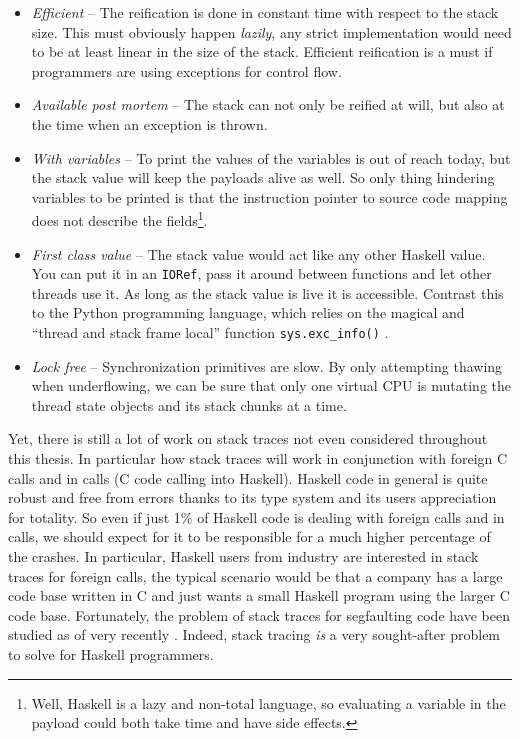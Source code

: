 \begin{itemize}
  \item
    \emph{Efficient} -- The reification is done in constant time with
    respect to the stack size. This must obviously happen \emph{lazily},
    any strict implementation would need to be at least linear in the
    size of the stack. Efficient reification is a must if programmers are
    using exceptions for control flow.

  \item
    \emph{Available post mortem} -- The stack can not only be reified at
    will, but also at the time when an exception is thrown.

  \item
    \emph{With variables} -- To print the values of the variables is out
    of reach today, but the stack value will keep the payloads alive as
    well. So only thing hindering variables to be printed is that the
    instruction pointer to source code mapping does not describe the
    fields\footnote{Well, Haskell is a lazy and non-total language, so
      evaluating a variable in the payload could both take time and have
      side effects.}.

  \item
    \emph{First class value} -- The stack value would act like any
    other Haskell value. You can put it in an \texttt{IORef}, pass it
    around between functions and let other threads use it. As long
    as the stack value is live it is accessible. Contrast this to
    the Python programming language, which relies on the magical and
    ``thread and stack frame local'' function \texttt{sys.exc\_info()}
    \cite{python_docs_sys_exc_info}.

  \item
    \emph{Lock free} -- Synchronization primitives are slow. By only
    attempting thawing when underflowing, we can be sure that only one virtual
    CPU is mutating the thread state objects and its stack chunks at a
    time.

\end{itemize}

Yet, there is still a lot of work on stack traces not even considered
throughout this thesis. In particular how stack traces will work in
conjunction with foreign C calls and in calls (C code calling into
Haskell). Haskell code in general is quite robust and free from errors
thanks to its type system and its users appreciation for totality. So
even if just 1\% of Haskell code is dealing with foreign calls and in
calls, we should expect for it to be responsible for a much higher
percentage of the crashes. In particular, Haskell users from industry
are interested in stack traces for foreign calls, the typical scenario
would be that a company has a large code base written in C and just
wants a small Haskell program using the larger C code base. Fortunately,
the problem of stack traces for segfaulting code have been studied as of
very recently \cite{github_blitzcode_ghc_stack}. Indeed, stack tracing
\emph{is} a very sought-after problem to solve for Haskell programmers.
